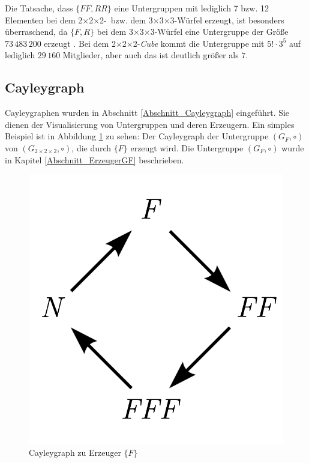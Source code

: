 \documentclass[12pt,a4paper, usenames, dvipsnames]{article}
\theoremstyle{mystyle}
\theoremstyle{definition}
\newcommand{\Gtwo}{\ensuremath{G_{2\times 2\times 2}}}
\newcommand{\Ttwo}{2$\times$2$\times$2-}
\newcommand{\Tthree}{3$\times$3$\times$3-}
\begin{document}
Die Tatsache, dass $\{ FF, RR \}$ eine Untergruppen mit lediglich 7 bzw. 12 Elementen bei dem \Ttwo \  bzw. dem \Tthree Würfel erzeugt, ist besonders überraschend, da $\{ F, R \}$ bei dem  \Tthree Würfel eine Untergruppe der Größe $73\, 483\, 200$ erzeugt \cite{TD}. 
Bei dem \Ttwo \textit{Cube} kommt die Untergruppe mit $5! \cdot 3^5$ auf lediglich $29 \, 160$ Mitglieder, aber auch das ist deutlich größer als $7$.

%
%
%
%
%
%
%
%
%
%
%
%
%
%
%
%

\subsection{Cayleygraph}

Cayleygraphen wurden in Abschnitt \ref{Abschnitt_Cayleygraph} eingeführt. Sie dienen der Visualisierung von Untergruppen und deren Erzeugern.
Ein simples Beispiel ist in Abbildung \ref{Abbildung_CayleygraphF} zu sehen: Der Cayleygraph der Untergruppe $(G_F, \circ)$ von $(\Gtwo, \circ)$, die durch $\{ F \}$  erzeugt wird. Die Untergruppe $(G_F, \circ)$ wurde in Kapitel \ref{Abschnitt_ErzeugerGF} beschrieben.

\begin{figure}[H]
\centering
\includegraphics[scale=0.6]{Cayleygraph1.png}
\caption{Cayleygraph zu Erzeuger $\{ F \}$}
\label{Abbildung_CayleygraphF}
\end{figure}
\end{document}
